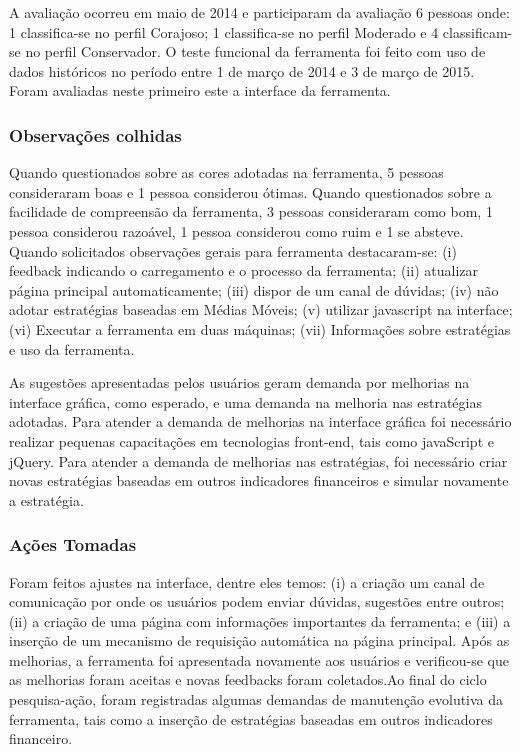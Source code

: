 A avaliação ocorreu em maio de 2014 e participaram da avaliação 6 pessoas onde: 1 classifica-se no perfil Corajoso; 1 classifica-se no perfil Moderado e 4 classificam-se no perfil Conservador. O teste funcional da ferramenta foi feito com uso de dados históricos no período entre 1 de março de 2014 e 3 de março de 2015. Foram avaliadas neste primeiro este a interface da ferramenta.

\subsubsection{Observações colhidas}

Quando questionados sobre as cores adotadas na ferramenta, 5 pessoas consideraram boas e 1 pessoa considerou ótimas. Quando questionados sobre a facilidade de compreensão da ferramenta, 3 pessoas consideraram como bom, 1 pessoa considerou razoável, 1 pessoa considerou como ruim e 1 se absteve. Quando solicitados observações gerais para ferramenta destacaram-se: (i) feedback indicando o carregamento e o processo da ferramenta; (ii) atualizar página principal automaticamente; (iii) dispor de um canal de dúvidas; (iv) não adotar estratégias baseadas em Médias Móveis; (v) utilizar javascript na interface; (vi) Executar a ferramenta em duas máquinas; (vii) Informações sobre estratégias e uso da ferramenta.

As sugestões apresentadas pelos usuários geram demanda por melhorias na interface gráfica, como esperado, e uma demanda na melhoria nas estratégias adotadas. Para atender a demanda de melhorias na interface gráfica foi necessário realizar pequenas capacitações em tecnologias front-end, tais como javaScript e jQuery. Para atender a demanda de melhorias nas estratégias, foi necessário criar novas estratégias baseadas em outros indicadores financeiros e simular novamente a estratégia.

\subsubsection{Ações Tomadas}

Foram feitos ajustes na interface, dentre eles temos: (i) a criação um canal de comunicação por onde os usuários podem enviar dúvidas, sugestões entre outros; (ii) a criação de uma página com informações importantes da ferramenta; e (iii) a inserção de um mecanismo de requisição automática na página principal. Após as melhorias, a ferramenta foi apresentada novamente aos usuários e verificou-se que as melhorias foram aceitas e novas feedbacks foram coletados.Ao final do ciclo pesquisa-ação, foram registradas algumas demandas de manutenção evolutiva da ferramenta, tais como a inserção de estratégias baseadas em outros indicadores financeiro. 

